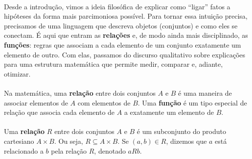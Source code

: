 \documentclass[12pt,a4paper]{article}
\begin{document}
\paragraph{}
Desde a introdução, vimos a ideia filosófica de explicar como “ligar” fatos a hipóteses da forma mais parcimoniosa possível. Para tornar essa intuição precisa, precisamos de uma linguagem que descreva objetos (conjuntos) e como eles se conectam. É aqui que entram as \textbf{relações} e, de modo ainda mais disciplinado, as \textbf{funções}: regras que associam a cada elemento de um conjunto exatamente um elemento de outro. Com elas, passamos do discurso qualitativo sobre explicações para uma estrutura matemática que permite medir, comparar e, adiante, otimizar.


\paragraph{}
Na matemática, uma \textbf{relação} entre dois conjuntos \(A\) e \(B\) é uma maneira de associar elementos de \(A\) com elementos de \(B\). Uma \textbf{função} é um tipo especial de relação que associa cada elemento de \(A\) a exatamente um elemento de \(B\).

\paragraph{}
Uma \textbf{relação} \(R\) entre dois conjuntos \(A\) e \(B\) é um subconjunto do produto cartesiano \(A \times B\). Ou seja, \(R \subseteq A \times B\). Se \((a,b) \in R\), dizemos que \(a\) está relacionado a \(b\) pela relação \(R\), denotado \(aRb\).
\end{document}
